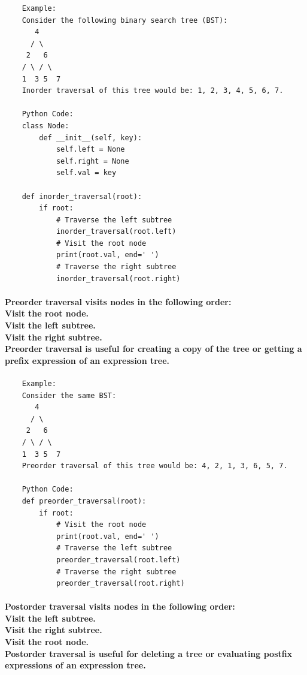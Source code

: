 \documentclass{article}
\begin{document}
\begin{verbatim}
    Example:
    Consider the following binary search tree (BST):
       4
      / \
     2   6
    / \ / \
    1  3 5  7
    Inorder traversal of this tree would be: 1, 2, 3, 4, 5, 6, 7.

    Python Code:
    class Node:
        def __init__(self, key):
            self.left = None
            self.right = None
            self.val = key

    def inorder_traversal(root):
        if root:
            # Traverse the left subtree
            inorder_traversal(root.left)
            # Visit the root node
            print(root.val, end=' ')
            # Traverse the right subtree
            inorder_traversal(root.right)
\end{verbatim}

\paragraph{
    Preorder traversal visits nodes in the following order:\\
    Visit the root node.\\
    Visit the left subtree.\\
    Visit the right subtree.\\
    Preorder traversal is useful for creating a copy of the tree or getting a prefix expression of an expression tree.\\
}

\begin{verbatim}
    Example:
    Consider the same BST:
       4
      / \
     2   6
    / \ / \
    1  3 5  7
    Preorder traversal of this tree would be: 4, 2, 1, 3, 6, 5, 7.

    Python Code:
    def preorder_traversal(root):
        if root:
            # Visit the root node
            print(root.val, end=' ')
            # Traverse the left subtree
            preorder_traversal(root.left)
            # Traverse the right subtree
            preorder_traversal(root.right)
\end{verbatim}

\paragraph{
    Postorder traversal visits nodes in the following order:\\
    Visit the left subtree.\\
    Visit the right subtree.\\
    Visit the root node.\\
    Postorder traversal is useful for deleting a tree or evaluating postfix expressions of an expression tree.\\
}
\end{document}
